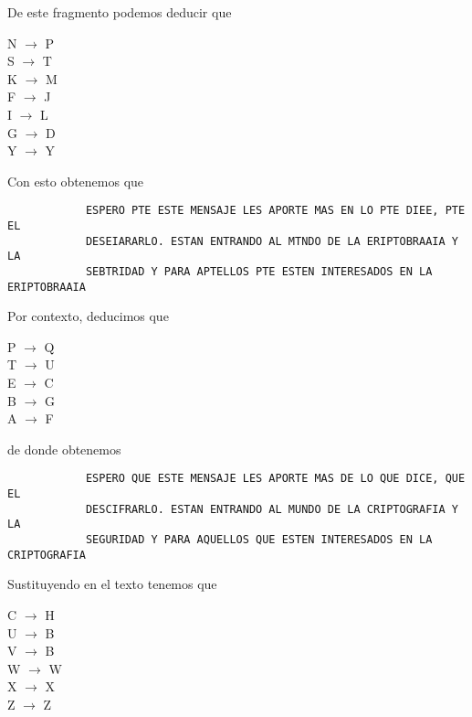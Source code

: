 \documentclass[letterpaper,10pt]{article}
\begin{document}
\begin{enumerate}
\begin{enumerate}
        De este fragmento podemos deducir que 
        \begin{center}
            N $\rightarrow$ P \\
            S $\rightarrow$ T \\
            K $\rightarrow$ M \\
            F $\rightarrow$ J \\
            I $\rightarrow$ L \\
            G $\rightarrow$ D \\
            Y $\rightarrow$ Y
        \end{center}
        
        Con esto obtenemos que 
        \begin{verbatim}
            ESPERO PTE ESTE MENSAJE LES APORTE MAS EN LO PTE DIEE, PTE EL
            DESEIARARLO. ESTAN ENTRANDO AL MTNDO DE LA ERIPTOBRAAIA Y LA
            SEBTRIDAD Y PARA APTELLOS PTE ESTEN INTERESADOS EN LA ERIPTOBRAAIA
        \end{verbatim}
        
        Por contexto, deducimos que 
        \begin{center}
            P $\rightarrow$ Q \\
            T $\rightarrow$ U \\
            E $\rightarrow$ C \\
            B $\rightarrow$ G \\
            A $\rightarrow$ F
        \end{center}
        
        de donde obtenemos
        \begin{verbatim}
            ESPERO QUE ESTE MENSAJE LES APORTE MAS DE LO QUE DICE, QUE EL
            DESCIFRARLO. ESTAN ENTRANDO AL MUNDO DE LA CRIPTOGRAFIA Y LA
            SEGURIDAD Y PARA AQUELLOS QUE ESTEN INTERESADOS EN LA CRIPTOGRAFIA
        \end{verbatim}
        
        Sustituyendo en el texto tenemos que 
        \begin{center}
            C $\rightarrow$ H \\
            U $\rightarrow$ B \\
            V $\rightarrow$ B \\
            W $\rightarrow$ W \\
            X $\rightarrow$ X \\
            Z $\rightarrow$ Z
        \end{center}


\end{enumerate}
\end{enumerate}
\end{document}

